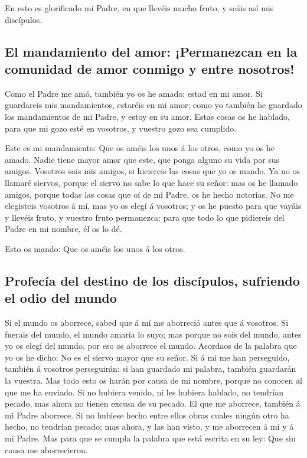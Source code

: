  En esto es glorificado mi Padre, en que llevéis mucho
fruto, y seáis así mis discípulos.

\hypertarget{el-mandamiento-del-amor-permanezcan-en-la-comunidad-de-amor-conmigo-y-entre-nosotros}{%
\subsection{El mandamiento del amor: ¡Permanezcan en la comunidad de
amor conmigo y entre
nosotros!}\label{el-mandamiento-del-amor-permanezcan-en-la-comunidad-de-amor-conmigo-y-entre-nosotros}}

 Como el Padre me amó, también yo os he amado: estad en mi
amor.  Si guardareis mis mandamientos, estaréis en mi
amor; como yo también he guardado los mandamientos de mi Padre, y estoy
en su amor.  Estas cosas os he hablado, para que mi gozo
esté en vosotros, y vuestro gozo sea cumplido.

 Este es mi mandamiento: Que os améis los unos á los
otros, como yo os he amado.  Nadie tiene mayor amor que
este, que ponga alguno su vida por sus amigos.  Vosotros
sois mis amigos, si hiciereis las cosas que yo os mando. 
Ya no os llamaré siervos, porque el siervo no sabe lo que hace su señor:
mas os he llamado amigos, porque todas las cosas que oí de mi Padre, os
he hecho notorias.  No me elegisteis vosotros á mí, mas
yo os elegí á vosotros; y os he puesto para que vayáis y llevéis fruto,
y vuestro fruto permanezca: para que todo lo que pidiereis del Padre en
mi nombre, él os lo dé.

 Esto os mando: Que os améis los unos á los otros.

\hypertarget{profecuxeda-del-destino-de-los-discuxedpulos-sufriendo-el-odio-del-mundo}{%
\subsection{Profecía del destino de los discípulos, sufriendo el odio
del
mundo}\label{profecuxeda-del-destino-de-los-discuxedpulos-sufriendo-el-odio-del-mundo}}

 Si el mundo os aborrece, sabed que á mí me aborreció
antes que á vosotros.  Si fuerais del mundo, el mundo
amaría lo suyo; mas porque no sois del mundo, antes yo os elegí del
mundo, por eso os aborrece el mundo.  Acordaos de la
palabra que yo os he dicho: No es el siervo mayor que su señor. Si á mí
me han perseguido, también á vosotros perseguirán: si han guardado mi
palabra, también guardarán la vuestra.  Mas todo esto os
harán por causa de mi nombre, porque no conocen al que me ha enviado.
 Si no hubiera venido, ni les hubiera hablado, no
tendrían pecado, mas ahora no tienen excusa de su pecado.
 El que me aborrece, también á mi Padre aborrece.
 Si no hubiese hecho entre ellos obras cuales ningún otro
ha hecho, no tendrían pecado; mas ahora, y las han visto, y me aborrecen
á mí y á mi Padre.  Mas para que se cumpla la palabra que
está escrita en su ley: Que sin causa me aborrecieron.

